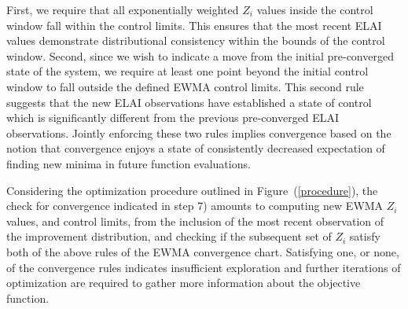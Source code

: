 \documentclass{article}
\begin{document}
%
First, we require that all exponentially weighted $Z_i$ values inside the 
control window fall within the control limits. This ensures that the most 
recent ELAI values demonstrate distributional consistency within the bounds of 
the control window. Second, since we wish to indicate a move from the initial 
pre-converged state of the system, we require at least one point beyond the 
initial control window to fall outside the defined EWMA control limits. This 
second rule suggests that the new ELAI observations have established a state 
of control which is significantly different from the previous pre-converged 
ELAI observations. Jointly enforcing these two rules implies convergence based 
on the notion that convergence enjoys a state of consistently decreased 
expectation of finding new minima in future function evaluations.

%
%

%
Considering the optimization procedure outlined in Figure~(\ref{procedure}), 
the check for convergence indicated in step 7) amounts to computing new EWMA 
$Z_i$ values, and control limits, from the inclusion of the most recent 
observation of the improvement distribution, and checking if the subsequent 
set of $Z_i$ satisfy both of the above rules of the EWMA convergence 
chart. Satisfying one, or none, of the convergence rules indicates insufficient 
exploration and further iterations of optimization are required to gather more 
information about the objective function.    


%
%
%
\end{document}
